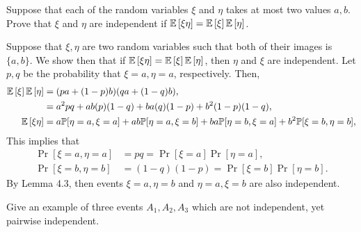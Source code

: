 \begin{problem}{4}
    Suppose that each of the random variables $\xi$ and $\eta$ takes at most two values $a,b$. Prove that $\xi$ and $\eta$ are independent if $\mathbb{E}\left[\xi\eta\right] = \mathbb{E}\left[\xi\right]\mathbb{E}\left[\eta\right]$. 
\end{problem}
\begin{solution}
    Suppose that $\xi,\eta$ are two random variables such that both of their images is $\{a,b\}$. We show then that if $\mathbb{E}\left[\xi\eta\right] = \mathbb{E}\left[\xi\right]\mathbb{E}\left[\eta\right]$, then $\eta$ and $\xi$ are independent. Let $p,q$ be the probability that $\xi = a,\eta=a$, respectively. Then, 
    \begin{align*}
        \mathbb{E}\left[\xi\right]\mathbb{E}\left[\eta\right] &= (pa + (1-p)b)(qa + (1-q)b), \\
        &= a^2pq + ab(p)(1-q) + ba(q)(1-p) + b^2(1-p)(1-q), \\
        \mathbb{E}\left[\xi\eta\right] &= a\mathbb{P}[\eta=a,\xi=a] + ab\mathbb{P}[\eta=a,\xi=b] + ba\mathbb{P}[\eta=b,\xi=a] + b^2\mathbb{P}[\xi=b,\eta=b],
    \end{align*}
    This implies that 
    \begin{align*}
        \Pr[\xi=a,\eta=a] &= pq = \Pr[\xi=a]\Pr[\eta=a], \\
        \Pr[\xi=b,\eta=b] &= (1-q)(1-p) = \Pr[\xi=b]\Pr[\eta=b].
    \end{align*}
    By Lemma 4.3, then events $\xi = a, \eta = b$ and $\eta=a,\xi=b$ are also independent. 
\end{solution}
\begin{problem}{5}
    Give an example of three events $A_1, A_2, A_3$ which are not independent, yet pairwise independent.
\end{problem}
